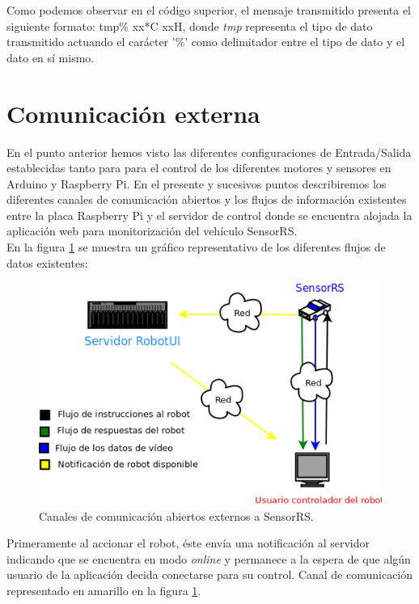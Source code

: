 Como podemos observar en el código superior, el mensaje transmitido presenta el siguiente formato: tmp\% xx*C xxH, donde \emph{tmp} representa el tipo de dato transmitido actuando el carácter '\%' como 
delimitador entre el tipo de dato y el dato en sí mismo.\\


\section{Comunicación externa}

En el punto anterior hemos visto las diferentes configuraciones de Entrada/Salida establecidas tanto para para el control de los diferentes motores y sensores en Arduino y Raspberry Pi. 
En el presente y sucesivos puntos describiremos los diferentes canales de comunicación abiertos y los flujos de información existentes entre la placa Raspberry Pi y el servidor de control donde 
se encuentra alojada la aplicación web para monitorización del vehículo SensorRS.\\

En la figura \ref{figura:comunicaciones-robot} se muestra un gráfico representativo de los diferentes flujos de datos existentes:

\begin{figure}[H]
  \begin{center}
    \includegraphics[scale=0.6]{diagramas/flujo-comunicaciones-robot.png}
  \end{center}
  \caption{Canales de comunicación abiertos externos a SensorRS.}
  \label{figura:comunicaciones-robot}
\end{figure}

Primeramente al accionar el robot, éste envía una notificación al servidor indicando que se encuentra en modo \emph{online} y permanece a la espera de que algún usuario de la aplicación decida
conectarse para su control. Canal de comunicación representado en amarillo en la figura \ref{figura:comunicaciones-robot}.\\

